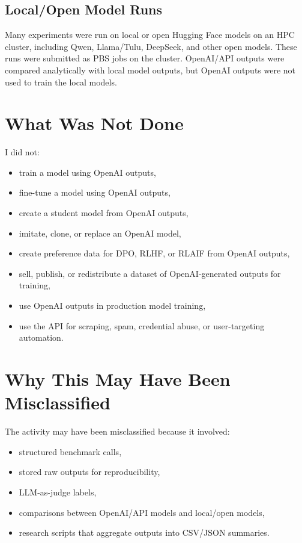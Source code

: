 \documentclass[11pt]{article}
\begin{document}
\subsection{Local/Open Model Runs}

Many experiments were run on local or open Hugging Face models on an HPC cluster,
including Qwen, Llama/Tulu, DeepSeek, and other open models. These runs were
submitted as PBS jobs on the cluster. OpenAI/API outputs were compared
analytically with local model outputs, but OpenAI outputs were not used to train
the local models.

\section{What Was Not Done}

I did not:

\begin{itemize}
  \item train a model using OpenAI outputs,
  \item fine-tune a model using OpenAI outputs,
  \item create a student model from OpenAI outputs,
  \item imitate, clone, or replace an OpenAI model,
  \item create preference data for DPO, RLHF, or RLAIF from OpenAI outputs,
  \item sell, publish, or redistribute a dataset of OpenAI-generated outputs for training,
  \item use OpenAI outputs in production model training,
  \item use the API for scraping, spam, credential abuse, or user-targeting automation.
\end{itemize}

\section{Why This May Have Been Misclassified}

The activity may have been misclassified because it involved:

\begin{itemize}
  \item structured benchmark calls,
  \item stored raw outputs for reproducibility,
  \item LLM-as-judge labels,
  \item comparisons between OpenAI/API models and local/open models,
  \item research scripts that aggregate outputs into CSV/JSON summaries.
\end{itemize}
\end{document}
